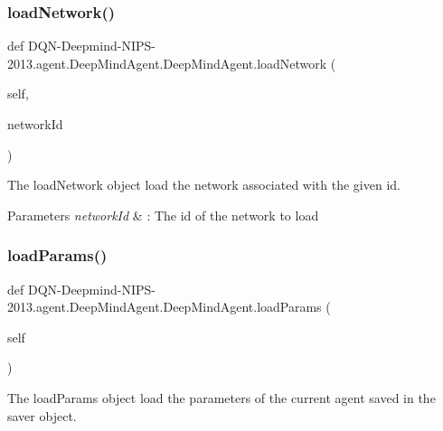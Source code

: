 \subsubsection{\texorpdfstring{load\+Network()}{loadNetwork()}}
{\footnotesize\ttfamily def D\+QN-\/Deepmind-\/N\+I\+PS-\/2013.agent.\+Deep\+Mind\+Agent.\+Deep\+Mind\+Agent.\+load\+Network (\begin{DoxyParamCaption}\item[{}]{self,  }\item[{}]{network\+Id }\end{DoxyParamCaption})}



The load\+Network object load the network associated with the given id. 


\begin{DoxyParams}{Parameters}
{\em network\+Id} & \+: The id of the network to load \\
\hline
\end{DoxyParams}
\hypertarget{classDQN-Deepmind-NIPS-2013_1_1agent_1_1DeepMindAgent_1_1DeepMindAgent_ae3b30ec9438fbaa91c440415e43844fe}{}\label{classDQN-Deepmind-NIPS-2013_1_1agent_1_1DeepMindAgent_1_1DeepMindAgent_ae3b30ec9438fbaa91c440415e43844fe} 
\subsubsection{\texorpdfstring{load\+Params()}{loadParams()}}
{\footnotesize\ttfamily def D\+QN-\/Deepmind-\/N\+I\+PS-\/2013.agent.\+Deep\+Mind\+Agent.\+Deep\+Mind\+Agent.\+load\+Params (\begin{DoxyParamCaption}\item[{}]{self }\end{DoxyParamCaption})}



The load\+Params object load the parameters of the current agent saved in the saver object. 

\hypertarget{classDQN-Deepmind-NIPS-2013_1_1agent_1_1DeepMindAgent_1_1DeepMindAgent_af6fed7cfbd89dfe3e1d625842e9364de}{}\label{classDQN-Deepmind-NIPS-2013_1_1agent_1_1DeepMindAgent_1_1DeepMindAgent_af6fed7cfbd89dfe3e1d625842e9364de} 
